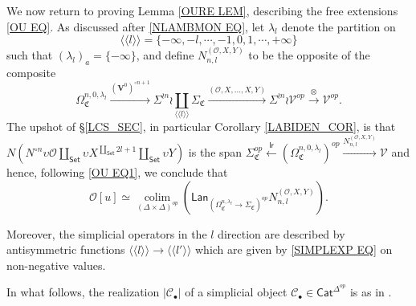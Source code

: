 \documentclass[a4paper,10pt
]{article}%
\numberwithin{equation}{section}
\numberwithin{figure}{section}
\theoremstyle{definition} %
\DeclareMathOperator{\colim}{colim}%
\newcommand{\V}{\ensuremath{\mathcal V}}
\renewcommand{\O}{\ensuremath{\mathcal O}}
\newcommand{\1}{\ensuremath{\mathbbm 1}}%
\begin{document}
We now return to proving Lemma \ref{OURE LEM},
describing the free extensions \eqref{OU EQ}.
As discussed after \eqref{NLAMBMON EQ},
let $\lambda_l$ denote the partition on 
\[
\langle \langle l \rangle \rangle
=
\{-\infty,-l,\cdots,-1,0,1,\cdots,+\infty\}
\]
such that $\left(\lambda_l\right)_a = \{-\infty\}$,
and define $N_{n,l}^{(\O,X,Y)}$ to be the opposite of the composite
\[
\Omega_{\mathfrak C}^{n,0,\lambda_l} \xrightarrow{(\boldsymbol{V}^0)^{\circ n+1}}
\Sigma^{\wr n} \wr \coprod_{\langle \langle l \rangle \rangle} \Sigma_{\mathfrak C} \xrightarrow{(\O,X,\dots,X,Y)}
\Sigma^{\wr n} \wr \V^{op} \xrightarrow{\otimes}
\V^{op}.
\]
The upshot of \S \ref{LCS_SEC}, in particular Corollary \ref{LABIDEN_COR}, is that
$\mbox{$N \left(N^{\circ n} \upsilon \O \amalg_{\mathsf{Set}} \upsilon X^{\amalg_{\mathsf{Set}} 2l +1}\amalg_{\mathsf{Set}} \upsilon Y \right)$}$
is the span
$\mbox{$\Sigma_{\mathfrak C}^{op} \xleftarrow{\mathsf{lr}} (\Omega_{\mathfrak C}^{n,0,\lambda_l})^{op} \xrightarrow{N_{n,l}^{(\O,X,Y)}} \V$}$
and hence, following \eqref{OU EQ1}, we conclude that
\begin{equation}\label{1STRED EQ}
\O[u] \simeq
\mathop{\colim}\limits_{(\Delta \times \Delta)^{op}}
\left(
\mathsf{Lan}_{\left(\Omega_{\mathfrak C}^{n,\lambda_l} \to \Sigma_{\mathfrak C}\right)^{op}} N_{n,l}^{(\O,X,Y)}
\right).
\end{equation}


Moreover, the simplicial operators in the $l$ direction are described by antisymmetric functions $\langle \langle l \rangle \rangle
\to \langle \langle l' \rangle \rangle
$
which are given by \eqref{SIMPLEXP EQ} on non-negative values.

In what follows,
the realization $|\mathcal{C}_{\bullet}|$
of a simplicial object
$\mathcal{C}_{\bullet} \in \mathsf{Cat}^{\Delta^{op}}$
is as in \cite[(A.1)]{BP21}.
\end{document}
